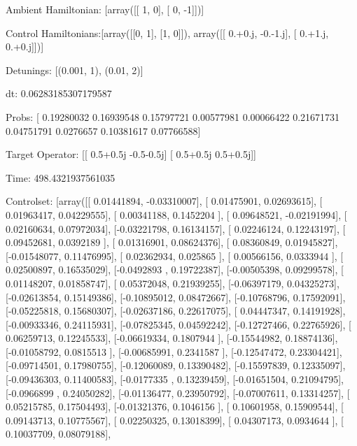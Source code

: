 \documentclass{article}
\begin{document}
    

\newpage

Ambient Hamiltonian: [array([[ 1,  0],
       [ 0, -1]])]

Control Hamiltonians:[array([[0, 1],
       [1, 0]]), array([[ 0.+0.j, -0.-1.j],
       [ 0.+1.j,  0.+0.j]])]

Detunings: [(0.001, 1), (0.01, 2)]

 dt: 0.06283185307179587

Probs: [ 0.19280032  0.16939548  0.15797721  0.00577981  0.00066422  0.21671731
  0.04751791  0.0276657   0.10381617  0.07766588]

Target Operator: [[ 0.5+0.5j -0.5-0.5j]
 [ 0.5+0.5j  0.5+0.5j]]

Time: 498.4321937561035

Controlset: [array([[ 0.01441894, -0.03310007],
       [ 0.01475901,  0.02693615],
       [ 0.01963417,  0.04229555],
       [ 0.00341188,  0.1452204 ],
       [ 0.09648521, -0.02191994],
       [ 0.02160634,  0.07972034],
       [-0.03221798,  0.16134157],
       [ 0.02246124,  0.12243197],
       [ 0.09452681,  0.0392189 ],
       [ 0.01316901,  0.08624376],
       [ 0.08360849,  0.01945827],
       [-0.01548077,  0.11476995],
       [ 0.02362934,  0.025865  ],
       [ 0.00566156,  0.0333944 ],
       [ 0.02500897,  0.16535029],
       [-0.0492893 ,  0.19722387],
       [-0.00505398,  0.09299578],
       [ 0.01148207,  0.01858747],
       [ 0.05372048,  0.21939255],
       [-0.06397179,  0.04325273],
       [-0.02613854,  0.15149386],
       [-0.10895012,  0.08472667],
       [-0.10768796,  0.17592091],
       [-0.05225818,  0.15680307],
       [-0.02637186,  0.22617075],
       [ 0.04447347,  0.14191928],
       [-0.00933346,  0.24115931],
       [-0.07825345,  0.04592242],
       [-0.12727466,  0.22765926],
       [ 0.06259713,  0.12245533],
       [-0.06619334,  0.1807944 ],
       [-0.15544982,  0.18874136],
       [-0.01058792,  0.0815513 ],
       [-0.00685991,  0.2341587 ],
       [-0.12547472,  0.23304421],
       [-0.09714501,  0.17980755],
       [-0.12060089,  0.13390482],
       [-0.15597839,  0.12335097],
       [-0.09436303,  0.11400583],
       [-0.0177335 ,  0.13239459],
       [-0.01651504,  0.21094795],
       [-0.0966899 ,  0.24050282],
       [-0.01136477,  0.23950792],
       [-0.07007611,  0.13314257],
       [ 0.05215785,  0.17504493],
       [-0.01321376,  0.1046156 ],
       [ 0.10601958,  0.15909544],
       [ 0.09143713,  0.10775567],
       [ 0.02250325,  0.13018399],
       [ 0.04307173,  0.0934644 ],
       [ 0.10037709,  0.08079188],
\end{document}
